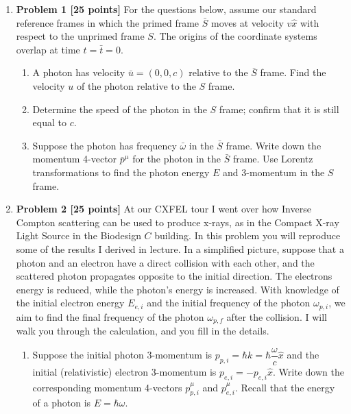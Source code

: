 \documentclass[fleqn]{article}
\begin{document}
  \begin{enumerate}
    \item \textbf{Problem 1 [25 points]}
    For the questions below, assume our standard reference frames in which the primed frame $\bar{S}$
    moves at velocity $v \hat{x}$ with respect to the unprimed frame $S$. The origins of the coordinate 
    systems overlap at time $t=\bar{t}=0$.
    \begin{enumerate}
      \item A photon has velocity $\bar{u}=(0,0,c)$ relative to the $\bar{S}$ frame. Find the velocity $u$
      of the photon relative to the $S$ frame.

      \item Determine the speed of the photon in the $S$ frame; confirm that it is still equal to $c$.

      \item Suppose the photon has frequency $\bar{\omega}$ in the $\bar{S}$ frame. Write down the momentum
      4-vector $\bar{p}^{\mu}$ for the photon in the $\bar{S}$ frame. Use Lorentz transformations to find the 
      photon energy $E$ and 3-momentum in the $S$ frame.
    \end{enumerate}

    \pagebreak




    \item \textbf{Problem 2 [25 points]}
    At our CXFEL tour I went over how Inverse Compton scattering can be used to produce x-rays, as
    in the Compact X-ray Light Source in the Biodesign $C$ building. In this problem you will reproduce
    some of the results I derived in lecture. In a simplified picture, suppose that a photon and an electron
    have a direct collision with each other, and the scattered photon propagates opposite to the initial
    direction. The electrons energy is reduced, while the photon’s energy is increased. With knowledge
    of the initial electron energy $E_{e,i}$ and the initial frequency of the photon $\omega_{p, i}$, we aim 
    to find the final frequency of the photon $\omega_{p,f}$ after the collision. I will walk you through the 
    calculation, and you fill in the details.
    \begin{enumerate}
      \item Suppose the initial photon 3-momentum is $p_{p,i}=\hbar k=\hbar \dfrac{\omega}{c} \hat{x}$
      and the initial (relativistic) electron 3-momentum is $p_{e,i}=-p_{e,i} \hat{x}$. Write down the 
      corresponding momentum 4-vectors $p^{\mu}_{p,i}$ and $p^{\mu}_{e,i}$. Recall that the energy of a 
      photon is $E=\hbar \omega$.


\end{enumerate}
\end{enumerate}
\end{document}
